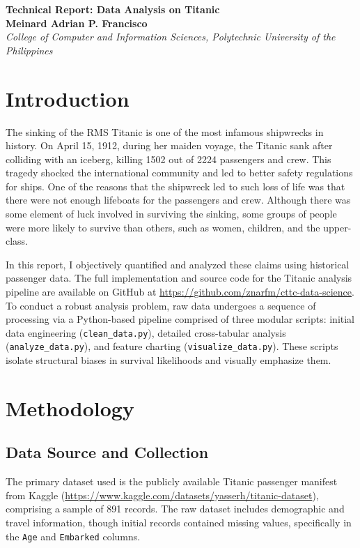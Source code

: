 \documentclass[11pt]{article}
\begin{document}
\begin{center}
  {\LARGE \textbf{Technical Report: Data Analysis on Titanic}}\\
  \vspace{0.5em}
  \textbf{Meinard Adrian P. Francisco}\\
  \textit{College of Computer and Information Sciences, Polytechnic University of the Philippines}\\
  \text{\today} %
\end{center}

\section{Introduction}
The sinking of the RMS Titanic is one of the most infamous shipwrecks in history. On April 15, 1912, during her maiden voyage, the Titanic sank after colliding with an iceberg, killing 1502 out of 2224 passengers and crew. This tragedy shocked the international community and led to better safety regulations for ships. One of the reasons that the shipwreck led to such loss of life was that there were not enough lifeboats for the passengers and crew. Although there was some element of luck involved in surviving the sinking, some groups of people were more likely to survive than others, such as women, children, and the upper-class.

In this report, I objectively quantified and analyzed these claims using historical passenger data. The full implementation and source code for the Titanic analysis pipeline are available on GitHub at \url{https://github.com/znarfm/cttc-data-science}. To conduct a robust analysis problem, raw data undergoes a sequence of processing via a Python-based pipeline comprised of three modular scripts: initial data engineering (\texttt{clean\_data.py}), detailed cross-tabular analysis (\texttt{analyze\_data.py}), and feature charting (\texttt{visualize\_data.py}). These scripts isolate structural biases in survival likelihoods and visually emphasize them.

\section{Methodology}

\subsection{Data Source and Collection}
The primary dataset used is the publicly available Titanic passenger manifest from Kaggle (\url{https://www.kaggle.com/datasets/yasserh/titanic-dataset}), comprising a sample of 891 records. The raw dataset includes demographic and travel information, though initial records contained missing values, specifically in the \texttt{Age} and \texttt{Embarked} columns.
\end{document}
